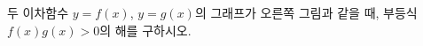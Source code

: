 \hspace*{2mm}\begin{minipage}[t]{\dimexpr\linewidth-2mm\relax}\vspace{0pt}
\noindent\begin{minipage}[t]{0.58\linewidth}\vspace{0pt}\raggedright 두 이차함수 $y=f(x)$, $y=g(x)$의 그래프가 오른쪽 그림과 같을 때, 부등식 $f(x)g(x)>0$의 해를 구하시오.\end{minipage}\hfill\begin{minipage}[t]{0.4\linewidth}\vspace{0pt}\centering \resizebox{\ifdim\width>\linewidth\linewidth\else\width\fi}{!}{}\end{minipage}\par\end{minipage}
